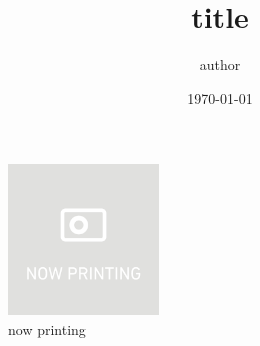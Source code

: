 \documentclass[dvipdfmx, paper=a4, fontsize=10pt]{jlreq}
\title{title}
\author{author}
\date{\today}
\begin{document}
    \maketitle

    \begin{figure}
        \centering
        \includegraphics[width=40mm]{image/nowprinting.png}
        \caption{now printing}
    \end{figure}
\end{document}
